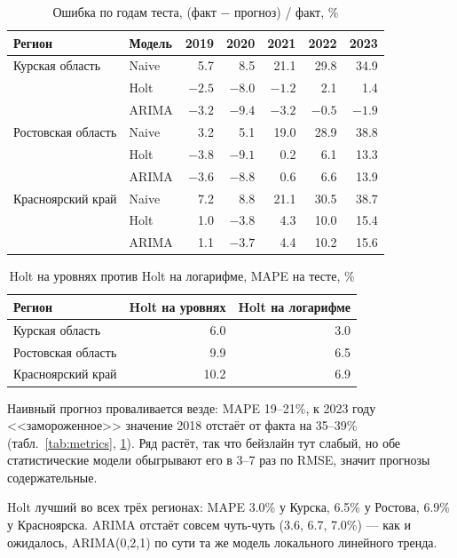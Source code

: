 \documentclass[12pt,a4paper]{report}
\begin{document}
\begin{table}[H]
\centering
\caption{Ошибка по годам теста, (факт $-$ прогноз) / факт, \%}
\label{tab:test_errors}
\small
\begin{tabular}{llrrrrr}
\toprule
Регион & Модель & 2019 & 2020 & 2021 & 2022 & 2023 \\
\midrule
Курская область & Naive & 5.7 & 8.5 & 21.1 & 29.8 & 34.9 \\
 & Holt & $-2.5$ & $-8.0$ & $-1.2$ & 2.1 & 1.4 \\
 & ARIMA & $-3.2$ & $-9.4$ & $-3.2$ & $-0.5$ & $-1.9$ \\
\midrule
Ростовская область & Naive & 3.2 & 5.1 & 19.0 & 28.9 & 38.8 \\
 & Holt & $-3.8$ & $-9.1$ & 0.2 & 6.1 & 13.3 \\
 & ARIMA & $-3.6$ & $-8.8$ & 0.6 & 6.6 & 13.9 \\
\midrule
Красноярский край & Naive & 7.2 & 8.8 & 21.1 & 30.5 & 38.7 \\
 & Holt & 1.0 & $-3.8$ & 4.3 & 10.0 & 15.4 \\
 & ARIMA & 1.1 & $-3.7$ & 4.4 & 10.2 & 15.6 \\
\bottomrule
\end{tabular}
\end{table}

\begin{table}[H]
\centering
\caption{Holt на уровнях против Holt на логарифме, MAPE на тесте, \%}
\label{tab:holt_lvl}
\begin{tabular}{lrr}
\toprule
Регион & Holt на уровнях & Holt на логарифме \\
\midrule
Курская область & 6.0 & 3.0 \\
Ростовская область & 9.9 & 6.5 \\
Красноярский край & 10.2 & 6.9 \\
\bottomrule
\end{tabular}
\end{table}

Наивный прогноз проваливается везде: MAPE 19--21\%, к 2023 году <<замороженное>> значение 2018 отстаёт от факта на 35--39\% (табл.~\ref{tab:metrics}, \ref{tab:test_errors}). Ряд растёт, так что бейзлайн тут слабый, но обе статистические модели обыгрывают его в 3--7 раз по RMSE, значит прогнозы содержательные.

Holt лучший во всех трёх регионах: MAPE 3.0\% у Курска, 6.5\% у Ростова, 6.9\% у Красноярска. ARIMA отстаёт совсем чуть-чуть (3.6, 6.7, 7.0\%) --- как и ожидалось, ARIMA(0,2,1) по сути та же модель локального линейного тренда.
\end{document}
